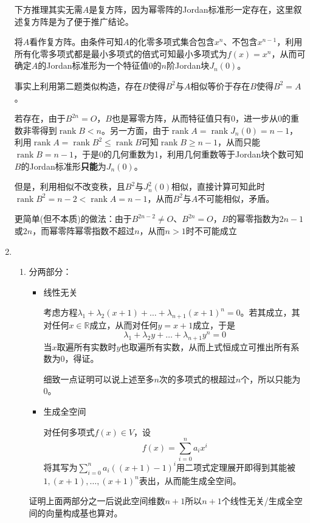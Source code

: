 \documentclass[a4paper,UTF8,fontset=windows,AutoFakeBold]{ctexart}
\DeclareMathOperator{\rank}{rank}
\newcommand*{\note}{\noindent *}
\begin{document}
\begin{enumerate}
    \note 下方推理其实无需$A$是复方阵，因为幂零阵的Jordan标准形一定存在，这里叙述复方阵是为了便于推广结论。
    
    将$A$看作复方阵。由条件可知$A$的化零多项式集合包含$x^n$、不包含$x^{n-1}$，利用所有化零多项式都是最小多项式的倍式可知最小多项式为$f(x)=x^n$，从而可确定$A$的Jordan标准形为一个特征值0的$n$阶Jordan块$J_n(0)$。

    \note 事实上利用第二题类似构造，存在$B$使得$B^2$与$A$相似等价于存在$B$使得$B^2=A$。

    若存在，由于$B^{2n}=O$，$B$也是幂零方阵，从而特征值只有0，进一步从0的重数非零得到$\rank B<n$。另一方面，由于$\rank A=\rank J_n(0)=n-1$，利用$\rank A=\rank B^2\le\rank B$可知$\rank B\ge n-1$，从而只能$\rank B=n-1$，于是0的几何重数为1，利用几何重数等于Jordan块个数可知$B$的Jordan标准形\textbf{只能}为$J_n(0)$。

    但是，利用相似不改变秩，且$B^2$与$J_n^2(0)$相似，直接计算可知此时$\rank B^2=n-2<\rank A=n-1$，从而$B^2$与$A$不可能相似，矛盾。

    \note 更简单(但不本质)的做法：由于$B^{2n-2}\ne O$、$B^{2n}=O$，$B$的幂零指数为$2n-1$或$2n$，而幂零阵幂零指数不超过$n$，从而$n>1$时不可能成立

    \item
    \begin{enumerate}
        \item 分两部分：
        \begin{itemize}
            \item 线性无关
            
            考虑方程$\lambda_1+\lambda_2(x+1)+\dots+\lambda_{n+1}(x+1)^n=0$。若其成立，其对任何$x\in\mathbb{R}$成立，从而对任何$y=x+1$成立，于是
            $$\lambda_1+\lambda_2y+\dots+\lambda_{n+1}y^n=0$$
            当$x$取遍所有实数时$y$也取遍所有实数，从而上式恒成立可推出所有系数为0，得证。

            \note 细致一点证明可以说上述至多$n$次的多项式的根超过$n$个，所以只能为0。

            \item 生成全空间

            对任何多项式$f(x)\in V$，设
            $$f(x)=\sum_{i=0}^na_ix^i$$
            将其写为$\sum_{i=0}^na_i((x+1)-1)^i$用二项式定理展开即得到其能被$1,(x+1),\dots,(x+1)^n$表出，从而能生成全空间。
        \end{itemize}

        \note 证明上面两部分之一后说此空间维数$n+1$所以$n+1$个线性无关/生成全空间的向量构成基也算对。


\end{enumerate}
\end{enumerate}
\end{document}
